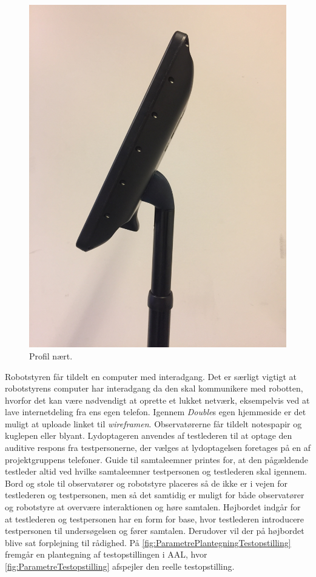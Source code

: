 \begin{figure}[H]
\begin{minipage}{.33\textwidth}
  \includegraphics[width=\linewidth, angle =-90]{Figure/TestdesignParametre/ModificeretDoubleSideClose}
  \caption{Profil nært.}
  \label{fig:ModificeretDoubleSideClose}
\end{minipage}
\end{figure}
\noindent
%
Robotstyren får tildelt en computer med interadgang. Det er særligt vigtigt at robotstyrens computer har interadgang da den skal kommunikere med robotten, hvorfor det kan være nødvendigt at oprette et lukket netværk, eksempelvis ved at lave internetdeling fra ens egen telefon. Igennem \textit{Double}s egen hjemmeside er det muligt at uploade linket til \textit{wireframen}. Observatørerne får tildelt notespapir og kuglepen eller blyant. Lydoptageren anvendes af testlederen til at optage den auditive respons fra testpersonerne, der vælges at lydoptagelsen foretages på en af projektgruppens telefoner. Guide til samtaleemner printes for, at den pågældende testleder altid ved hvilke samtaleemner testpersonen og testlederen skal igennem. Bord og stole til observatører og robotstyre placeres så de ikke er i vejen for testlederen og testpersonen, men så det samtidig er muligt for både observatører og robotstyre at overvære interaktionen og høre samtalen. Højbordet indgår for at testlederen og testpersonen har en form for base, hvor testlederen introducere testpersonen til undersøgelsen og fører samtalen. Derudover vil der på højbordet blive sat forplejning til rådighed. På \autoref{fig:ParametrePlantegningTestopstilling} fremgår en plantegning af testopstillingen i AAL, hvor \autoref{fig:ParametreTestopstilling} afspejler den reelle testopstilling. 
